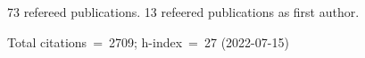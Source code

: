 73 refereed publications. 13 refeered publications as first author.

Total citations~=~2709; h-index~=~27 (2022-07-15)